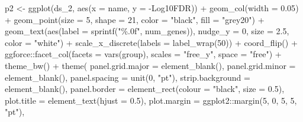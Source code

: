 \documentclass[
  11pt,
  oneside]{book}
\newenvironment{Shaded}{\begin{snugshade}}{\end{snugshade}}
\newcommand{\AttributeTok}[1]{\textcolor[rgb]{0.77,0.63,0.00}{#1}}
\newcommand{\DecValTok}[1]{\textcolor[rgb]{0.00,0.00,0.81}{#1}}
\newcommand{\FloatTok}[1]{\textcolor[rgb]{0.00,0.00,0.81}{#1}}
\newcommand{\FunctionTok}[1]{\textcolor[rgb]{0.00,0.00,0.00}{#1}}
\newcommand{\NormalTok}[1]{#1}
\newcommand{\OtherTok}[1]{\textcolor[rgb]{0.56,0.35,0.01}{#1}}
\newcommand{\SpecialCharTok}[1]{\textcolor[rgb]{0.00,0.00,0.00}{#1}}
\newcommand{\StringTok}[1]{\textcolor[rgb]{0.31,0.60,0.02}{#1}}
\begin{document}
\begin{Shaded}
\begin{Highlighting}[]
\NormalTok{p2 }\OtherTok{\textless{}{-}} \FunctionTok{ggplot}\NormalTok{(ds\_2, }\FunctionTok{aes}\NormalTok{(}\AttributeTok{x =}\NormalTok{ name, }\AttributeTok{y =} \StringTok{\textasciigrave{}}\AttributeTok{{-}Log10FDR}\StringTok{\textasciigrave{}}\NormalTok{)) }\SpecialCharTok{+}
  \FunctionTok{geom\_col}\NormalTok{(}\AttributeTok{width =} \FloatTok{0.05}\NormalTok{) }\SpecialCharTok{+}
  \FunctionTok{geom\_point}\NormalTok{(}\AttributeTok{size =} \DecValTok{5}\NormalTok{, }\AttributeTok{shape =} \DecValTok{21}\NormalTok{, }\AttributeTok{color =} \StringTok{"black"}\NormalTok{, }\AttributeTok{fill =} \StringTok{"grey20"}\NormalTok{) }\SpecialCharTok{+}
  \FunctionTok{geom\_text}\NormalTok{(}\FunctionTok{aes}\NormalTok{(}\AttributeTok{label =} \FunctionTok{sprintf}\NormalTok{(}\StringTok{"\%.0f"}\NormalTok{, num\_genes)), }\AttributeTok{nudge\_y =} \DecValTok{0}\NormalTok{, }\AttributeTok{size =} \FloatTok{2.5}\NormalTok{, }\AttributeTok{color =} \StringTok{"white"}\NormalTok{) }\SpecialCharTok{+}
  \FunctionTok{scale\_x\_discrete}\NormalTok{(}\AttributeTok{labels =} \FunctionTok{label\_wrap}\NormalTok{(}\DecValTok{50}\NormalTok{)) }\SpecialCharTok{+}
  \FunctionTok{coord\_flip}\NormalTok{() }\SpecialCharTok{+}
\NormalTok{  ggforce}\SpecialCharTok{::}\FunctionTok{facet\_col}\NormalTok{(}\AttributeTok{facets =} \FunctionTok{vars}\NormalTok{(group), }\AttributeTok{scales =} \StringTok{"free\_y"}\NormalTok{, }\AttributeTok{space =} \StringTok{"free"}\NormalTok{) }\SpecialCharTok{+}
  \FunctionTok{theme\_bw}\NormalTok{() }\SpecialCharTok{+}
  \FunctionTok{theme}\NormalTok{(}
    \AttributeTok{panel.grid.major =} \FunctionTok{element\_blank}\NormalTok{(),}
    \AttributeTok{panel.grid.minor =} \FunctionTok{element\_blank}\NormalTok{(),}
    \AttributeTok{panel.spacing =} \FunctionTok{unit}\NormalTok{(}\DecValTok{0}\NormalTok{, }\StringTok{"pt"}\NormalTok{),}
    \AttributeTok{strip.background =} \FunctionTok{element\_blank}\NormalTok{(),}
    \AttributeTok{panel.border =} \FunctionTok{element\_rect}\NormalTok{(}\AttributeTok{colour =} \StringTok{"black"}\NormalTok{, }\AttributeTok{size =} \FloatTok{0.5}\NormalTok{),}
    \AttributeTok{plot.title =} \FunctionTok{element\_text}\NormalTok{(}\AttributeTok{hjust =} \FloatTok{0.5}\NormalTok{),}
    \AttributeTok{plot.margin =}\NormalTok{ ggplot2}\SpecialCharTok{::}\FunctionTok{margin}\NormalTok{(}\DecValTok{5}\NormalTok{, }\DecValTok{0}\NormalTok{, }\DecValTok{5}\NormalTok{, }\DecValTok{5}\NormalTok{, }\StringTok{"pt"}\NormalTok{),}

\end{Highlighting}
\end{Shaded}
\end{document}
